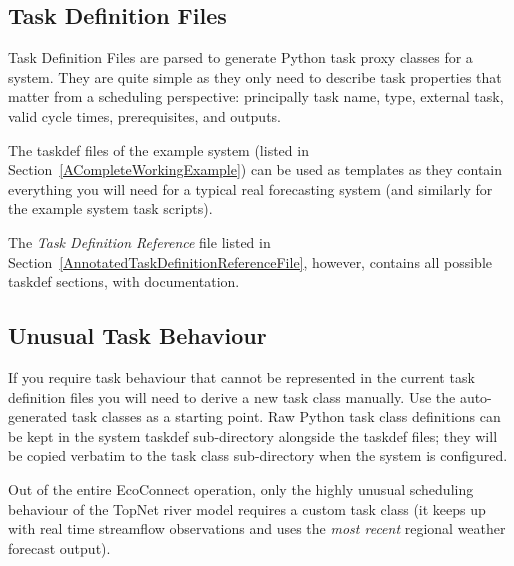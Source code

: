 \documentclass[11pt,a4paper]{article}
\begin{document}
\subsection{Task Definition Files} 
\label{TaskDefinitionFiles}

Task Definition Files are parsed to generate Python task proxy
classes for a system. They are quite simple as they only need to 
describe task properties that matter from a scheduling perspective:
principally task name, type, external task, valid cycle times,
prerequisites, and outputs.  

The taskdef files of the example system (listed in
Section~\ref{ACompleteWorkingExample}) can be used as templates as they
contain everything you will need for a typical real forecasting system 
(and similarly for the example system task scripts).

The {\em Task Definition Reference} file listed in
Section~\ref{AnnotatedTaskDefinitionReferenceFile}, however, contains
all possible taskdef sections, with documentation.


\subsection{Unusual Task Behaviour}
\label{UnusualTaskBehaviour}

If you require task behaviour that cannot be represented in the current 
task definition files you will need to derive a new task class manually.
Use the auto-generated task classes as a starting point. Raw Python 
task class definitions can be kept in the system taskdef sub-directory
alongside the taskdef files; they will be copied verbatim to the
task class sub-directory when the system is configured.

Out of the entire EcoConnect operation, only the highly unusual
scheduling behaviour of the TopNet river model requires a custom task
class (it keeps up with real time streamflow observations and uses
the {\em most recent} regional weather forecast output). 
\end{document}
